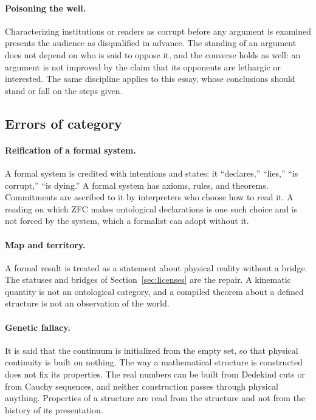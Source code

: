 \documentclass[11pt]{article}
\begin{document}
\paragraph{Poisoning the well.} Characterizing institutions or readers as corrupt before any argument is examined presents the audience as disqualified in advance. The standing of an argument does not depend on who is said to oppose it, and the converse holds as well: an argument is not improved by the claim that its opponents are lethargic or interested. The same discipline applies to this essay, whose conclusions should stand or fall on the steps given.

\subsection{Errors of category}

\paragraph{Reification of a formal system.} A formal system is credited with intentions and states: it ``declares,'' ``lies,'' ``is corrupt,'' ``is dying.'' A formal system has axioms, rules, and theorems. Commitments are ascribed to it by interpreters who choose how to read it. A reading on which ZFC makes ontological declarations is one such choice and is not forced by the system, which a formalist can adopt without it.

\paragraph{Map and territory.} A formal result is treated as a statement about physical reality without a bridge. The statuses and bridges of Section~\ref{sec:licenses} are the repair. A kinematic quantity is not an ontological category, and a compiled theorem about a defined structure is not an observation of the world.

\paragraph{Genetic fallacy.} It is said that the continuum is initialized from the empty set, so that physical continuity is built on nothing. The way a mathematical structure is constructed does not fix its properties. The real numbers can be built from Dedekind cuts or from Cauchy sequences, and neither construction passes through physical anything. Properties of a structure are read from the structure and not from the history of its presentation.
\end{document}
